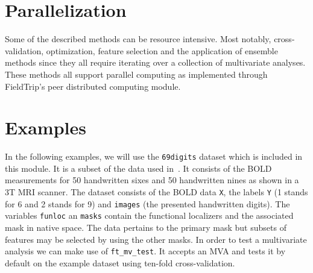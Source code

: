 \documentclass{article}
\renewcommand{\t}[1]{{\tt #1}}
\begin{document}
\newpage

\section{Parallelization}
\label{parallel}

Some of the described methods can be resource intensive. Most notably, cross-validation, optimization, feature selection and the application of ensemble methods since they all require iterating over a collection of multivariate analyses. These methods all support parallel computing as implemented through FieldTrip's peer distributed computing module.

\newpage

\section{Examples}
\label{examples}

In the following examples, we will use the \t{69digits} dataset which is included in this module. It is a subset of the data used in~\cite{gerven2010,gerven2010a}. It consists of the BOLD measurements for 50 handwritten sixes and 50 handwritten nines as shown in a 3T MRI scanner. The dataset consists of the BOLD data \t{X}, the labels \t{Y} (1 stands for 6 and 2 stands for 9) and \t{images} (the presented handwritten digits). The variables \t{funloc} an \t{masks} contain the functional localizers and the associated mask in native space. The data pertains to the primary mask but subsets of features may be selected by using the other masks. In order to test a multivariate analysis we can make use of \t{ft\_mv\_test}. It accepts an MVA and tests it by default on the example dataset using ten-fold cross-validation.
\end{document}
